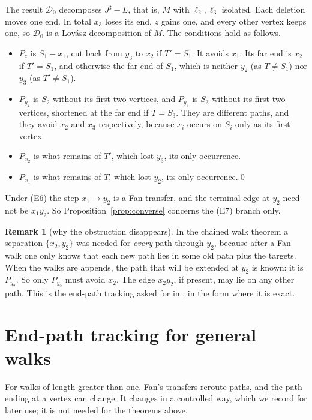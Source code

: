 \documentclass[11pt]{amsart}
\theoremstyle{definition}
\newtheorem{remark}[theorem]{Remark}
\newcommand{\cD}{\mathcal D}
\newcommand{\sh}{{\sharp}}
\begin{document}
The result $\cD_0$ decomposes $J^\sh-L$, that is, $M$ with $\ell_2,\ell_3$ isolated. Each deletion
moves one end. In total $x_3$ loses its end, $z$ gains one, and every other vertex keeps one, so
$\cD_0$ is a Lov\'asz decomposition of $M$. The conditions hold as follows.
\begin{itemize}
\item[(E1)] $P_z$ is $S_1-x_1$, cut back from $y_3$ to $x_2$ if $T'=S_1$. It avoids $x_1$. Its far
end is $x_2$ if $T'=S_1$, and otherwise the far end of $S_1$, which is neither $y_2$ (as
$T\ne S_1$) nor $y_3$ (as $T'\ne S_1$).
\item[(E2)--(E4)] $P_{y_2}$ is $S_2$ without its first two vertices, and $P_{y_3}$ is $S_3$
without its first two vertices, shortened at the far end if $T=S_3$. They are different paths,
and they avoid $x_2$ and $x_3$ respectively, because $x_i$ occurs on $S_i$ only as its first
vertex.
\item[(E5)] $P_{x_2}$ is what remains of $T'$, which lost $y_3$, its only occurrence.
\item[(E7)] $P_{x_1}$ is what remains of $T$, which lost $y_2$, its only occurrence.\qed
\end{itemize}

Under (E6) the step $x_1\to y_2$ is a Fan transfer, and the terminal edge at $y_2$ need not be
$x_1y_2$. So Proposition~\ref{prop:converse} concerns the (E7) branch only.

\begin{remark}[why the obstruction disappears]
In the chained walk theorem a separation $\{x_2,y_2\}$ was needed for \emph{every} path through
$y_2$, because after a Fan walk one only knows that each new path lies in some old path plus the
targets. When the walks are appends, the path that will be extended at $y_2$ is known: it is
$P_{y_2}$. So only $P_{y_2}$ must avoid $x_2$. The edge $x_2y_2$, if present, may lie on any
other path. This is the end-path tracking asked for in \cite[\S9(1)]{TM}, in the form where it is
exact.
\end{remark}

\section{End-path tracking for general walks}\label{sec:endpath}

For walks of length greater than one, Fan's transfers reroute paths, and the path ending at a
vertex can change. It changes in a controlled way, which we record for later use; it is not
needed for the theorems above.
\end{document}
